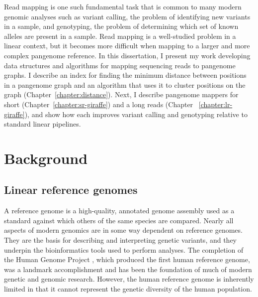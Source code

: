 \documentclass[11pt]{ucscthesis}
\begin{document}
Read mapping is one such fundamental task that is common to many modern genomic analyses such as variant calling, the problem of identifying new variants in a sample, and genotyping, the problem of determining which set of known alleles are present in a sample.
Read mapping is a well-studied problem in a linear context, but it becomes more difficult when mapping to a larger and more complex pangenome reference.
In this dissertation, I present my work developing data structures and algorithms for mapping sequencing reads to pangenome graphs.
I describe an index for finding the minimum distance between positions in a pangenome graph and an algorithm that uses it to cluster positions on the graph (Chapter~\ref{chapter:distance}).
Next, I describe pangenome mappers for short (Chapter~\ref{chapter:sr-giraffe}) and a long reads (Chapter ~\ref{chapter:lr-giraffe}), and show how each improves variant calling and genotyping relative to standard linear pipelines.

\chapter{Background}
\label{chapter:background}

\section{Linear reference genomes}
\label{sec:background:linear-genomes}

A reference genome is a high-quality, annotated genome assembly used as a standard against which others of the same species are compared. 
Nearly all aspects of modern genomics are in some way dependent on reference genomes.
They are the basis for describing and interpreting genetic variants, and they underpin the bioinformatics tools used to perform analyses.
The completion of the Human Genome Project \cite{lander_initial_2001}, which produced the first human reference genome, was a landmark accomplishment and has been the foundation of much of modern genetic and genomic research.
However, the human reference genome is inherently limited in that it cannot represent the genetic diversity of the human population.
\end{document}
